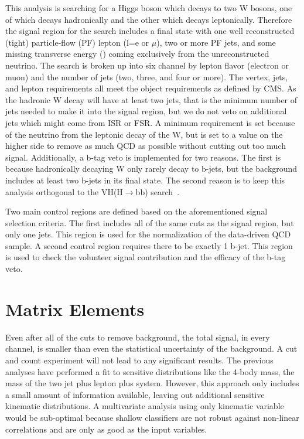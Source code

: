 This analysis is searching for a Higgs boson which decays to two W bosons, one of which decays hadronically and the other which decays leptonically.
Therefore the signal region for the search includes a final state with one well reconstructed (tight) particle-flow (PF) lepton (l=e or $\mu$), two or more PF jets, and some missing transverse energy (\ETslash) coming exclusively from the unreconstructed neutrino. The search is broken up into six channel by lepton flavor (electron or muon) and the number of jets (two, three, and four or more).
The vertex, jets, and lepton requirements all meet the object requirements as defined by CMS.
As the hadronic W decay will have at least two jets, that is the minimum number of jets needed to make it into the signal region, but we do not veto on additional jets which might come from ISR or FSR.
A minimum \ETslash requirement is set because of the neutrino from the leptonic decay of the W, but is set to a value on the higher side to remove as much QCD as possible without cutting out too much signal.
Additionally, a b-tag veto is implemented for two reasons.
The first is because hadronically decaying W only rarely decay to b-jets, but the \ttbar background includes at least two b-jets in its final state.
The second reason is to keep this analysis orthogonal to the VH(H$\rightarrow${bb}) search~\cite{PhysRevD.89.012003}.

Two main control regions are defined based on the aforementioned signal selection criteria.
The first includes all of the same cuts as the signal region, but only one jets.
This region is used for the normalization of the data-driven QCD sample.
A second control region requires there to be exactly 1 b-jet.
This region is used to check the volunteer signal contribution and the efficacy of the b-tag veto.

\section{Matrix Elements}

Even after all of the cuts to remove background, the total signal, in every channel, is smaller than even the statistical uncertainty of the background.
A cut and count experiment will not lead to any significant results.
The previous \HWWlnujj analyses have performed a fit to sensitive distributions like the 4-body mass, the mass of the two jet plus lepton plus \ETslash system.
However, this approach only includes a small amount of information available, leaving out additional sensitive kinematic distributions.
A multivariate analysis using only kinematic variable would be sub-optimal because shallow classifiers are not robust against non-linear correlations and are only as good as the input variables.

